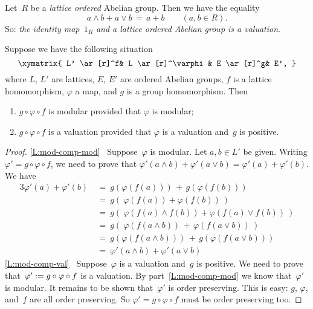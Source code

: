 \documentclass[main.tex]{subfiles}
\begin{document}
\begin{ex}
\label{E:1-valuation}
Let~$R$ be a \emph{lattice ordered} Abelian group.
Then we have the equality
\begin{equation*}
a\wedge b  + a\vee b \,=\, a+b \qquad(a,b\in R).
\end{equation*}
So: \emph{the identity map~$1_R$
and a lattice ordered Abelian group is a valuation}.
\end{ex}

\begin{lem}
\label{L:mod-comp}
Suppose we have the following situation
\begin{equation*}
\xymatrix{
L' \ar[r]^f&
L \ar[r]^\varphi&
E \ar[r]^g&
E',
}
\end{equation*}
where $L$, $L'$ are lattices,
$E$, $E'$ are ordered Abelian groups,
$f$ is a lattice homomorphism,
$\varphi$ a map,
and $g$ is a group homomorphism.
Then
\begin{enumerate}
\item
\label{L:mod-comp-mod}
$g\circ \varphi \circ f$ is modular
provided that $\varphi$ is modular;
\item
\label{L:mod-comp-val}
$g\circ \varphi \circ f$ is a valuation
provided that $\varphi$ is a valuation
and~$g$ is positive.
\end{enumerate}
\end{lem}
\begin{proof}
\noindent
\ref{L:mod-comp-mod}
\  Suppose~$\varphi$ is modular.
Let $a,b\in L'$ be given.
Writing $\varphi'= g\circ\varphi \circ f$,
we need to prove that
$\varphi'(a\wedge b)+\varphi'(a\vee b)=\varphi'(a)+\varphi'(b)$.
We have
\begin{alignat*}{3}
\varphi'(a) + \varphi'(b)
\ &=\ g(\varphi(f(a))) \,+\, g(\varphi(f(b))) \\
  &=\ g(\ \varphi( f(a)) + \varphi( f(b))\ ) \\
  &=\ g(\ \varphi(f(a)\wedge f(b)) + \varphi(f(a)\vee f(b))\ ) \\
  &=\ g(\  \varphi(f(a\wedge b)) \,+\, \varphi(f(a\vee b))\ ) \\
  &=\ g(\varphi(f(a\wedge b))) \,+\, g(\varphi(f(a\vee b))) \\ 
  &=\ \varphi'(a\wedge b) + \varphi'(a \vee b)
\end{alignat*}
\ref{L:mod-comp-val}
\  Suppose~$\varphi$ is a valuation
and~$g$ is positive.
We need to prove that~$\varphi':= g\circ \varphi\circ f$
is a valuation.
By part~\ref{L:mod-comp-mod}
we know that~$\varphi'$ is modular.
It remains to be shown that~$\varphi'$ is order preserving.
This is easy: $g$, $\varphi$, and~$f$ are all order preserving.
So $\varphi'=g\circ\varphi\circ f$ must be order preserving too.
\end{proof}
\end{document}
